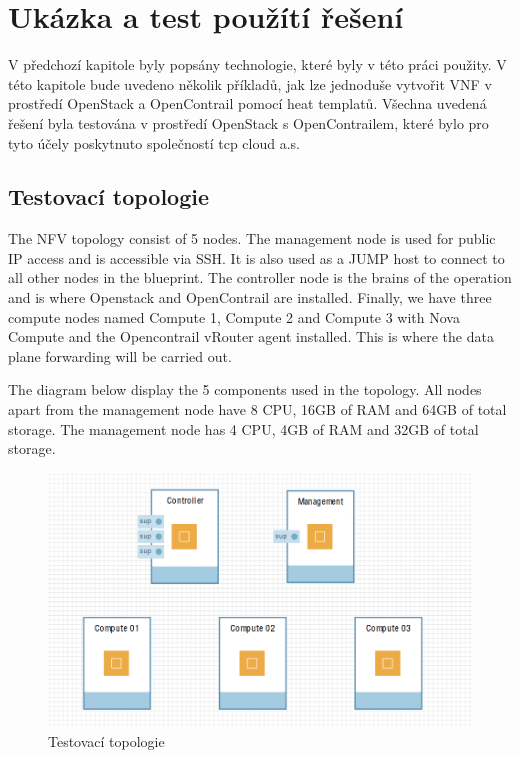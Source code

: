 \chapter{Ukázka a test použítí řešení}

V předchozí kapitole byly popsány technologie, které byly v této práci použity. V této kapitole bude uvedeno několik příkladů, jak lze jednoduše vytvořit VNF v prostředí OpenStack a OpenContrail pomocí heat templatů. Všechna uvedená řešení byla testována v prostředí OpenStack s OpenContrailem, které bylo pro tyto účely poskytnuto společností tcp cloud a.s.

\section{Testovací topologie}\label{sub:interaction}

The NFV topology consist of 5 nodes. The management node is used for public IP access and is accessible via SSH. It is also used as a JUMP host to connect to all other nodes in the blueprint. The controller node is the brains of the operation and is where Openstack and OpenContrail are installed. Finally, we have three compute nodes named Compute 1, Compute 2 and Compute 3 with Nova Compute and the Opencontrail vRouter agent installed. This is where the data plane forwarding will be carried out.

The diagram below display the 5 components used in the topology. All nodes apart from the management node have 8 CPU, 16GB of RAM and 64GB of total storage. The management node has 4 CPU, 4GB of RAM and 32GB of total storage.

\begin{figure}[h]
\begin{centering}
\includegraphics[scale=0.41]{images/ravello_topologie}
\par\end{centering}
\caption{Testovací topologie\label{fig:ravello_topologie}}
\end{figure}


